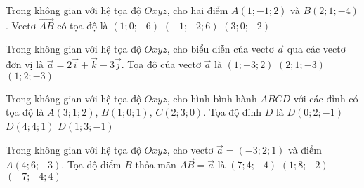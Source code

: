 \begin{ex}%
Trong không gian với hệ tọa độ $Oxyz$, cho hai điểm $A(1; -1; 2)$ và $B(2; 1; -4)$. Vectơ $\overrightarrow{AB}$ có tọa độ là
 {$(1; 0; -6)$}
 {$(-1; -2; 6)$}
 {$(3; 0; -2)$}
\end{ex}

\begin{ex}%
Trong không gian với hệ tọa độ $Oxyz$, cho biểu diễn của vectơ $\overrightarrow{a}$ qua các vectơ đơn vị là $\overrightarrow{a}=2\overrightarrow{i}+\overrightarrow{k}-3\overrightarrow{j}$. Tọa độ của vectơ $\overrightarrow{a}$ là
 {$(1; -3; 2)$}
 {$(2; 1; -3)$}
 {$(1; 2; -3)$}
\end{ex}

\begin{ex}%
Trong không gian với hệ tọa độ $Oxyz$, cho hình bình hành $ABCD$ với các đỉnh có tọa độ là $A(3; 1; 2)$, $B(1; 0; 1)$, $C(2; 3; 0)$. Tọa độ đỉnh $D$ là
 {$D(0; 2; -1)$}
 {\True $D(4; 4; 1)$}
 {$D(1; 3; -1)$}
\end{ex}

\begin{ex}%
Trong không gian với hệ tọa độ $Oxyz$, cho vectơ $\overrightarrow{a}=(-3; 2; 1)$ và điểm $A(4; 6; -3)$. Tọa độ điểm $B$ thỏa mãn $\overrightarrow{AB}=\overrightarrow{a}$ là
 {$(7; 4; -4)$}
 {\True $(1; 8; -2)$}
 {$(-7; -4; 4)$}
\end{ex}

